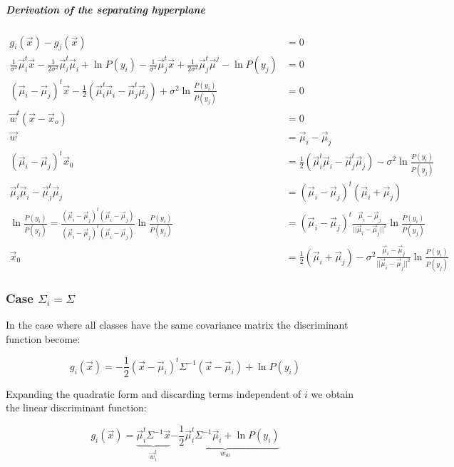 				\subparagraph{Derivation of the separating hyperplane}

				\begin{align*}
					g_i(\vec{x}) - g_j(\vec{x}) &= 0\\
					\frac{1}{\sigma^2}\vec{\mu}_i^t\vec{x}-\frac{1}{2\sigma^2}\vec{\mu}_i^t\vec{\mu}_i + \ln P(y_i) - \frac{1}{\sigma^2}\vec{\mu}_j^t\vec{x} + \frac{1}{2\sigma^2}\vec{\mu}_j^t\vec{\mu}^j - \ln P(y_j) & = 0\\
					 (\vec{\mu}_i-\vec{\mu}_j)^t\vec{x} - \frac{1}{2}(\vec{\mu}_i^t\vec{\mu}_i-\vec{\mu}_j^t\vec{\mu}_j)+\sigma^2\ln\frac{P(y_i)}{P(y_j)} &=0\\
					 \vec{w}^t(\vec{x}-\vec{x}_o) & = 0\\
					 \vec{w} &= \vec{\mu}_i-\vec{\mu}_j\\
					 (\vec{\mu}_i - \vec{\mu}_j)^t\vec{x}_0 &=\frac{1}{2}(\vec{\mu}_i^t\vec{\mu}_i - \vec{\mu}_j^t\vec{\mu}_j) - \sigma^2\ln\frac{P(y_i)}{P(y_j)}\\
					 \vec{\mu}_i^t\vec{\mu}_i - \vec{\mu}_j^t\vec{\mu}_j &= (\vec{\mu}_i - \vec{\mu}_j)^t(\vec{\mu}_i + \vec{\mu}_j)\\
					 \ln\frac{P(y_i)}{P(y_j)} = \frac{(\vec{\mu}_i -\vec{\mu}_j)^t(\vec{\mu}_i - \vec{\mu}_j)}{(\vec{\mu}_i -\vec{\mu}_j)^t(\vec{\mu}_i - \vec{\mu}_j)}\ln\frac{P(y_i)}{P(y_j)} &= (\vec{\mu}_i - \vec{\mu}_j)^t\frac{\vec{\mu}_i-\vec{\mu}_j}{||\vec{\mu}_i-\vec{\mu}_j||^2}\ln\frac{P(y_i)}{P(y_j)}\\
					\vec{x}_0 &= \frac{1}{2}(\vec{\mu}_i + \vec{\mu}_j) - \sigma^2 \frac{\vec{\mu}_i-\vec{\mu}_j}{||\vec{\mu}_i-\vec{\mu}_j||^2}\ln\frac{P(y_i)}{P(y_j)}
				\end{align*}

		\subsubsection{Case $\Sigma_i = \Sigma$}
		In the case where all classes have the same covariance matrix the discriminant function become:

		$$g_i(\vec{x}) = -\frac{1}{2}(\vec{x}-\vec{\mu}_i)^t\Sigma^{-1}(\vec{x}-\vec{\mu}_i) + \ln P(y_i)$$

		Expanding the quadratic form and discarding terms independent of $i$ we obtain the linear discriminant function:

		$$g_i(\vec{x}) = \underbrace{\vec{\mu}_i^t\Sigma^{-1}\vec{x}}_{\vec{w}_i^t} \underbrace{-\frac{1}{2}\vec{\mu}_i^t\Sigma^{-1}\vec{\mu}_i + \ln P(y_i)}_{w_{i0}}$$

